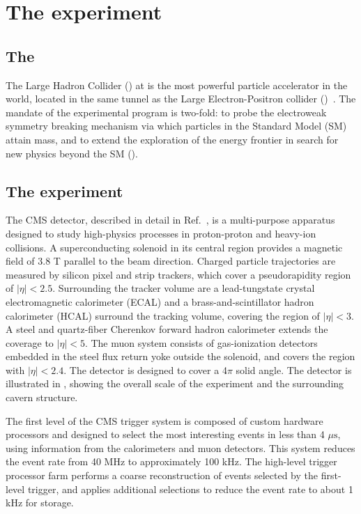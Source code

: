 \chapter{The \CMS experiment}
\label{chap:CMS}


\section{The \LHC}
The Large Hadron Collider (\LHC) at \CERN is the most powerful particle accelerator in the world, located in the same tunnel as the Large Electron-Positron collider (\LEP)~\cite{Brianti:2004qq}. The mandate of the \LHC experimental program is two-fold: to probe the electroweak symmetry breaking mechanism via which particles in the Standard Model (SM) attain mass, and to extend the exploration of the energy frontier in search for new physics beyond the SM (\BSM).

\section{The \CMS experiment}
\label{sec:CMSInDetail}

The CMS detector, described in detail in Ref.~\cite{CMS}, is a multi-purpose apparatus designed to study high-\pt physics processes in proton-proton and heavy-ion collisions. A superconducting solenoid in its central region provides a magnetic field of 3.8 T parallel to the beam direction. Charged particle trajectories are measured by silicon pixel and strip trackers, which cover a pseudorapidity region of $|\eta| < 2.5$. Surrounding the tracker volume are a lead-tungstate crystal electromagnetic calorimeter (ECAL) and a brass-and-scintillator hadron calorimeter (HCAL) surround the tracking volume, covering the region of $|\eta| < 3$. A steel and quartz-fiber Cherenkov forward hadron calorimeter extends the coverage to $|\eta| < 5$. The muon system consists of gas-ionization detectors embedded in the steel flux return yoke outside the solenoid, and covers the region with $|\eta| < 2.4$. The detector is designed to cover a 4$\pi$ solid angle. The detector is illustrated in , showing the overall scale of the experiment and the surrounding cavern structure.

\vspace{1cm}

The first level of the CMS trigger system is composed of custom hardware processors and designed to select the most interesting events in less than 4 $\mu\text{s}$, using information from the calorimeters and muon detectors. This system reduces the event rate from 40 MHz to approximately 100 kHz.  The high-level trigger processor farm performs a coarse reconstruction of events selected by the first-level trigger, and applies additional selections to reduce the event rate to about 1 kHz for storage.

